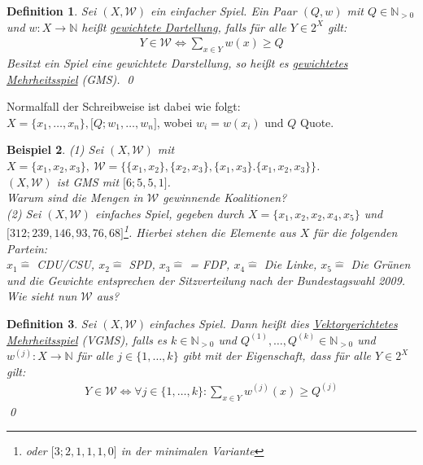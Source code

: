 \documentclass[ngerman]{scrartcl}
\theoremstyle{custom}
\newtheorem{mdef}{Definition} \numberwithin{mdef}{subsection}
\newtheorem{mex}[mdef]{Beispiel}
\newcommand{\0}{\mathbf{0}}
\newcommand{\1}{\mathbf{L}}
\newcommand{\sg}{$(X,\mathcal{W})~$}
\begin{document}
\begin{mdef}
Sei $(X, \mathcal{W})$ ein einfacher Spiel. Ein Paar $(Q, w)$ mit $Q
\in \mathds{N}_{>0}$ und $w: X \rightarrow \mathds{N}$ hei\ss t \underline{gewichtete
  Dartellung}, falls f\"ur alle $Y \in 2^X$ gilt:
\begin{align*}
Y \in \mathcal{W} \Leftrightarrow \sum_{x \in Y} w(x) \geq Q
\end{align*}
Besitzt ein Spiel eine gewichtete Darstellung, so hei\ss t es
\underline{gewichtetes Mehrheitsspiel} (GMS).
\qed
\end{mdef}
Normalfall der Schreibweise ist dabei wie folgt:\\
$X=\{x_1,\dots, x_n\}, \lbrack Q; w_1, \dots, w_n \rbrack$, wobei $w_i
= w(x_i)$ und $Q$ Quote.

\begin{mex}\label{mex:413}
(1) Sei $(X,\mathcal{W})$ mit $X = \{x_1,x_2, x_3\}, ~ \mathcal{W} =
\{\{x_1,x_2\}, \{x_2,x_3\}, \{x_1,x_3\}.\{x_1,x_2,x_3\}\}$.\\
$(X,\mathcal{W})$ ist GMS mit $\lbrack 6;5,5,1\rbrack$.\\
Warum sind die Mengen in $\mathcal{W}$ gewinnende Koalitionen?\\

(2) Sei $(X,\mathcal{W})$ einfaches Spiel, gegeben durch $X = \{ x_1, x_2,
x_2, x_4, x_5\}$ und $\lbrack 312; 239, 146, 93, 76, 68
\rbrack$\footnote{oder $\lbrack 3; 2, 1, 1, 1, 0 \rbrack$ in der
  minimalen Variante}. Hierbei stehen die Elemente aus $X$ f\"ur die
folgenden Partein:\\
$x_1 \mathrel{\widehat{=}}$  CDU/CSU, $x_2 \mathrel{\widehat{=}}$
SPD, $x_3 \mathrel{\widehat{=}}$  = FDP, $x_4 \mathrel{\widehat{=}}$
Die Linke, $x_5 \mathrel{\widehat{=}}$  Die Gr\"unen und die Gewichte
entsprechen der Sitzverteilung nach der Bundestagswahl 2009.\\
Wie sieht nun $\mathcal{W}$ aus?
\end{mex}

\begin{mdef}
Sei \sg einfaches Spiel. Dann hei\ss t dies
\underline{Vektorgerichtetes Mehrheitsspiel} (VGMS), falls es $k \in
\mathds{N}_{>0}$ und $Q^{(1)},\dots,Q^{(k)} \in \mathds{N}_{>0}$ und
$w^{(j)}: X \rightarrow \mathds{N}$ f\"ur alle $j \in \{1, \dots, k\}$
gibt mit der Eigenschaft, dass f\"ur alle $Y \in 2^X$ gilt:
\begin{align*}
Y \in \mathcal{W} \Leftrightarrow \forall j \in \{1, \dots, k\}:
\sum_{x \in Y} w^{(j)}(x) \geq Q^{(j)}
\end{align*}
\qed
\end{mdef}
\end{document}
